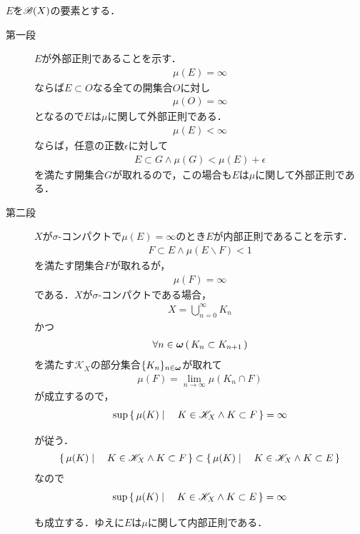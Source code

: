 		\begin{sketch} $E$を$\mathscr{B}(X)$の要素とする．
			\begin{description}
				\item[第一段] $E$が外部正則であることを示す．
					\begin{align}
						\mu(E) = \infty
					\end{align}
					ならば$E \subset O$なる全ての開集合$O$に対し
					\begin{align}
						\mu(O) = \infty
					\end{align}
					となるので$E$は$\mu$に関して外部正則である．
					\begin{align}
						\mu(E) < \infty
					\end{align}
					ならば，任意の正数$\epsilon$に対して
					\begin{align}
						E \subset G \wedge \mu(G) < \mu(E) + \epsilon
					\end{align}
					を満たす開集合$G$が取れるので，この場合も$E$は$\mu$に関して外部正則である．
				
				\item[第二段] $X$が$\sigma$-コンパクトで$\mu(E) = \infty$のとき$E$が内部正則であることを示す．
					\begin{align}
						F \subset E \wedge \mu(E \backslash F) < 1
					\end{align}
					を満たす閉集合$F$が取れるが，
					\begin{align}
						\mu(F) = \infty
					\end{align}
					である．$X$が$\sigma$-コンパクトである場合，
					\begin{align}
						X = \bigcup_{n=0}^\infty K_n
					\end{align}
					かつ
					\begin{align}
						\forall n \in {\boldsymbol \omega}\, (\, K_n \subset K_{n+1}\, )
					\end{align}
					を満たす$\mathscr{K}_X$の部分集合$\{K_n\}_{n \in {\boldsymbol \omega}}$が取れて
					\begin{align}
						\mu(F) = \lim_{n \to \infty} \mu(K_n \cap F)
					\end{align}
					が成立するので，
					\begin{align}
						\operatorname*{sup}_{} \left\{\, \mu(K) \mid \quad K \in \mathscr{K}_X \wedge K \subset F\, \right\} = \infty
					\end{align}
					が従う．
					\begin{align}
						\left\{\, \mu(K) \mid \quad K \in \mathscr{K}_X \wedge K \subset F\, \right\} \subset
						\left\{\, \mu(K) \mid \quad K \in \mathscr{K}_X \wedge K \subset E\, \right\}
					\end{align}
					なので
					\begin{align}
						\operatorname*{sup}_{} \left\{\, \mu(K) \mid \quad K \in \mathscr{K}_X \wedge K \subset E\, \right\} = \infty
					\end{align}
					も成立する．ゆえに$E$は$\mu$に関して内部正則である．
				

\end{description}
\end{sketch}
